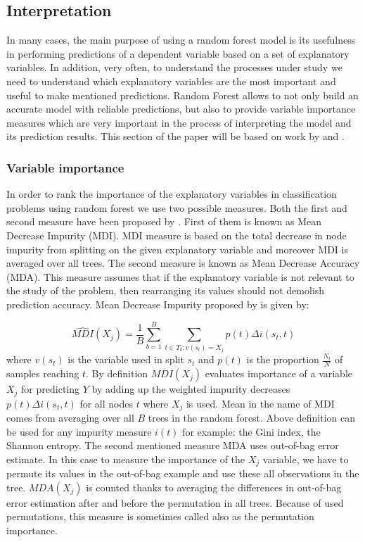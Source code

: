 \subsection{Interpretation}
In many cases, the main purpose of using a random forest model is its usefulness in performing predictions of a dependent variable
based on a set of explanatory variables. In addition, very often, to understand the processes under study we need to understand
which explanatory variables are the most important and useful to make mentioned predictions. 
Random Forest allows to not only build an accurate model with reliable predictions, 
but also to provide variable importance measures which are very important in the process of interpreting the model and 
its prediction results. This section of the paper will be based on work by \cite{louppe2013understanding} 
and \cite{gerard2016foresttour}.

\subsubsection{Variable importance}
In order to rank the importance of the explanatory variables in classification problems using random forest 
we use two possible measures. Both the first and second measure have been proposed by \cite{breiman2001random}. 
First of them is known as Mean Decrease Impurity (MDI). MDI measure is based on the total decrease in node impurity from splitting 
on the given explanatory variable and moreover MDI is averaged over all trees. 
The second measure is known as Mean Decrease Accuracy (MDA). 
This measure assumes that if the explanatory variable is not relevant to the study of the problem, 
then rearranging its values should not demolish prediction accuracy. Mean Decrease Impurity proposed 
by \cite{breiman2001random} is given by: 

\begin{equation}
	\widehat{MDI}( X_{j} ) = \frac{1}{B} \displaystyle \sum_{b=1}^{B}  \displaystyle\sum_{t \in T_{b}: v(s_{t}) 
	=  X_{j}  } p(t)\Delta i(s_{t}, t)
\end{equation}
where $ v(s_{t}) $ is the variable used in split $s_{t}$ and $ p(t) $ is the proportion $\frac{N_{t}}{N}$ of samples reaching $t$.
By definition $ MDI( X_{j} ) $ evaluates importance of a variable $ X_{j} $ for predicting $Y$ by 
adding up the weighted impurity decreases $p(t) \Delta i(s_{t}, t)$ for all nodes $t$ where $ X_{j}$ is used. 
Mean in the name of MDI comes from averaging over all $B$ trees in the random forest. 
Above definition can be used for any impurity measure $i(t)$ for example: the Gini index, the Shannon entropy. 
The second mentioned measure MDA uses out-of-bag error estimate. 
In this case to measure the importance of the $X_{j}$ variable, we have to permute its values in the out-of-bag example and 
use these all observations in the tree. $ MDA( X_{j} )$ is counted thanks to averaging the differences in 
out-of-bag error estimation after and before the permutation in all trees. Because of used permutations, 
this measure is sometimes called also as the permutation importance.

